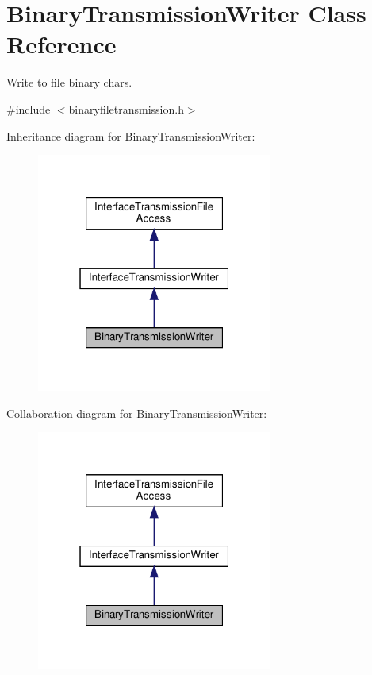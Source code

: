 \hypertarget{classBinaryTransmissionWriter}{}\section{Binary\+Transmission\+Writer Class Reference}
\label{classBinaryTransmissionWriter}


Write to file binary chars.  




{\ttfamily \#include $<$binaryfiletransmission.\+h$>$}



Inheritance diagram for Binary\+Transmission\+Writer\+:\nopagebreak
\begin{figure}[H]
\begin{center}
\leavevmode
\includegraphics[width=220pt]{d4/d45/classBinaryTransmissionWriter__inherit__graph}
\end{center}
\end{figure}


Collaboration diagram for Binary\+Transmission\+Writer\+:\nopagebreak
\begin{figure}[H]
\begin{center}
\leavevmode
\includegraphics[width=220pt]{da/d75/classBinaryTransmissionWriter__coll__graph}
\end{center}
\end{figure}
